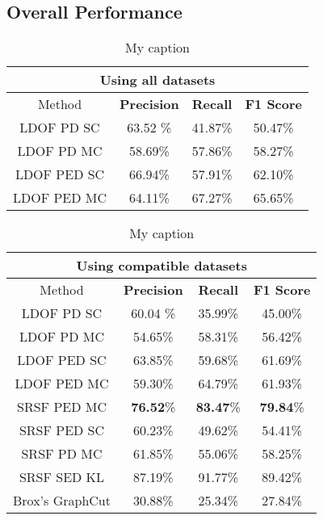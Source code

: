 \subsection{Overall Performance}



\begin{table}[H]
\centering
\begin{tabular}{|c|c|c|c|}
\hline
\multicolumn{4}{|c|}{Using all datasets}                        \\ \hline
Method & \textbf{Precision} & \textbf{Recall} & \textbf{F1 Score} \\ \hline
LDOF PD SC & 63.52 \%   & 41.87\%     & 50.47\%  \\ \hline
LDOF PD MC & 58.69\%   & 57.86\%     & 58.27\%  \\ \hline
LDOF PED SC & 66.94\%   & 57.91\%     & 62.10\%  \\ \hline
LDOF PED MC & 64.11\%   & 67.27\%     & 65.65\%  \\ \hline                 
\end{tabular}
\caption[Overall Performance]{My caption}
\label{tab:overall_performance}
\end{table}


\begin{table}[H]
\centering
\begin{tabular}{|c|c|c|c|}
\hline
\multicolumn{4}{|c|}{Using compatible datasets}                        \\ \hline
Method & \textbf{Precision} & \textbf{Recall} & \textbf{F1 Score} \\ \hline
LDOF PD SC & 60.04 \%   & 35.99\%     & 45.00\%  \\ \hline
LDOF PD MC & 54.65\%   & 58.31\%     & 56.42\%  \\ \hline
LDOF PED SC & 63.85\%   & 59.68\%     & 61.69\%  \\ \hline
LDOF PED MC & 59.30\%   & 64.79\%     & 61.93\%  \\ \hline
SRSF PED MC & \textbf{76.52}\%   & \textbf{83.47}\%     & \textbf{79.84}\%  \\ \hline
SRSF PED SC & 60.23\%   & 49.62\%     & 54.41\%  \\ \hline 
SRSF PD MC & 61.85\%   & 55.06\%     & 58.25\%  \\ \hline
SRSF SED KL & 87.19\%   & 91.77\%     & 89.42\%  \\ \hline
Brox's GraphCut & 30.88\%   & 25.34\%     & 27.84\%  \\ \hline                   
\end{tabular}
\caption[Overall Performance]{My caption}
\label{tab:overall_performance}
\end{table}


